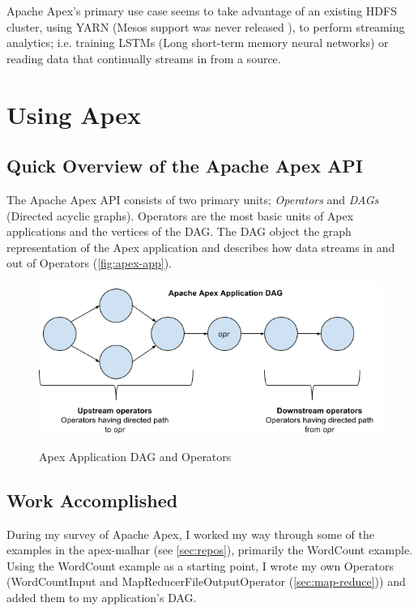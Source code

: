 \documentclass[final]{IEEEtran}
\begin{document}
Apache Apex's primary use case seems to take advantage of an existing HDFS cluster, using YARN (Mesos support was never released \cite{APEX-JIRA}), to perform streaming analytics; i.e. training LSTMs (Long short-term memory neural networks) or reading data that continually streams in from a source.

\section{Using Apex}
\subsection{Quick Overview of the Apache Apex API}
The Apache Apex API consists of two primary units; \emph{Operators} and \emph{DAGs} (Directed acyclic graphs). Operators are the most basic units of Apex applications and the vertices of the DAG. The DAG object the graph representation of the Apex application and describes how data streams in and out of Operators (\autoref{fig:apex-app})\cite{APEX-DOCS}.

\begin{figure}
  \includegraphics[scale=.4]{../images/apex-dag}
  \caption{Apex Application DAG and Operators}\cite{APEX-DOCS}
  \label{fig:apex-app}
  \centering
\end{figure}

\subsection{Work Accomplished}
During my survey of Apache Apex, I worked my way through some of the examples in the apex-malhar (see \ref{sec:repos}), primarily the WordCount example. Using the WordCount example as a starting point, I wrote my own Operators (WordCountInput and MapReducerFileOutputOperator (\ref{sec:map-reduce})) and added them to my application's DAG.
\end{document}
